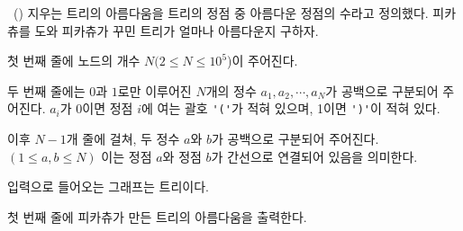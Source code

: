 \begin{problem}{\kcpcprobpretty\ (\kcpcprobprettyshort)}
    지우는 트리의 아름다움을 트리의 정점 중 아름다운 정점의 수라고 정의했다. 피카츄를 도와 피카츄가 꾸민 트리가 얼마나 아름다운지 구하자.
    
    \InputFile
    첫 번째 줄에 노드의 개수 $N(2 \leq N \leq 10^5$)이 주어진다.
    
    두 번째 줄에는 $0$과 $1$로만 이루어진 $N$개의 정수 $a_1, a_2, \cdots, a_N$가 공백으로 구분되어 주어진다. $a_i$가 0이면 정점 $i$에 여는 괄호 \verb|'('|가 적혀 있으며, 1이면 \verb|')'|이 적혀 있다.
    
    이후 $N-1$개 줄에 걸쳐, 두 정수 $a$와 $b$가 공백으로 구분되어 주어진다. $ (1 \leq a, b \leq N) $ 이는 정점 $a$와 정점 $b$가 간선으로 연결되어 있음을 의미한다.
    
    입력으로 들어오는 그래프는 트리이다.
    
    \OutputFile
    첫 번째 줄에 피카츄가 만든 트리의 아름다움을 출력한다.
    
    \Examples
    \begin{example}
    \end{example}
    

\end{problem}

